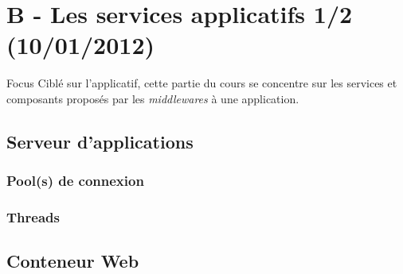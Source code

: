%

\section{B - Les services applicatifs 1/2 (10/01/2012)}
\begin{frame}
  \begin{block}{Focus}
    Ciblé sur l'applicatif, cette partie du cours se concentre sur les
    services et composants proposés par les \textit{middlewares} à une
    application.
  \end{block}
\end{frame}
\subsection{Serveur d'applications}
\subsubsection{Pool(s) de connexion}
\subsubsection{Threads}

\subsection{Conteneur Web}
